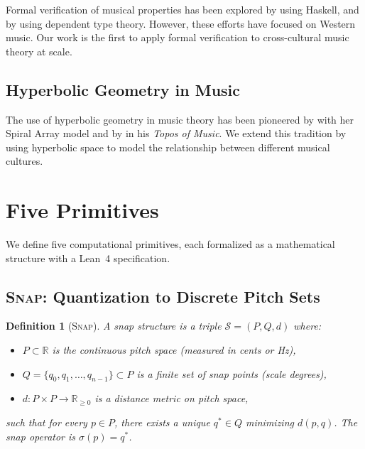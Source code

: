 \documentclass[cmj]{article}
\newtheorem{definition}{Definition}
\newcommand{\R}{\mathbb{R}}
\newcommand{\SNAP}{\textsc{Snap}}
\begin{document}
Formal verification of musical properties has been explored by
\citet{hudak2006hack} using Haskell, and by \citet{maggesi2022formal} using
dependent type theory. However, these efforts have focused on Western music.
Our work is the first to apply formal verification to cross-cultural music
theory at scale.

\subsection{Hyperbolic Geometry in Music}

The use of hyperbolic geometry in music theory has been pioneered by
\citet{chew2005mathematical} with her Spiral Array model and by
\citet{mazzola2002topos} in his \emph{Topos of Music}. We extend this
tradition by using hyperbolic space to model the relationship between
different musical cultures.

\section{Five Primitives}
\label{sec:primitives}

We define five computational primitives, each formalized as a mathematical
structure with a Lean~4 specification.

\subsection{\SNAP{}: Quantization to Discrete Pitch Sets}
\label{sec:primitive-snap}

\begin{definition}[\SNAP{}]
A \emph{snap structure} is a triple $\mathcal{S} = (P, Q, d)$ where:
\begin{itemize}[nosep]
  \item $P \subset \R$ is the continuous pitch space (measured in cents or Hz),
  \item $Q = \{q_0, q_1, \ldots, q_{n-1}\} \subset P$ is a finite set of
    \emph{snap points} (scale degrees),
  \item $d: P \times P \to \R_{\geq 0}$ is a distance metric on pitch space,
\end{itemize}
such that for every $p \in P$, there exists a unique $q^* \in Q$ minimizing
$d(p, q)$. The \emph{snap operator} is $\sigma(p) = q^*$.
\end{definition}
\end{document}
